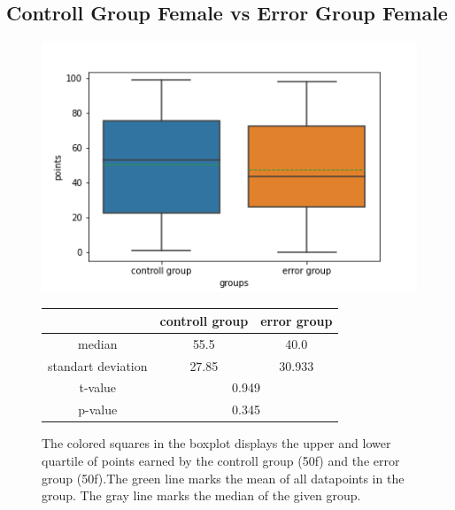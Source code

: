 \documentclass[runningheads]{llncs}
\begin{document}
\subsection{Controll Group Female vs Error Group Female}
\begin{figure}
    \begin{minipage}{0.45\textwidth}        
        \includegraphics[width=\textwidth]{code/generate/all.png}
        \caption{The colored squares in the boxplot displays
        the upper and lower quartile of points earned by the controll group (50f) and
        the error group (50f).The green line marks the mean of all datapoints in the group.
        The gray line marks the median  of the given group.} \label{fig3}
    \end{minipage}
\hfill
\begin{minipage}{0.45\textwidth}
\begin{tabular}[]{| c | c | c |}
        \hline
        & controll group & error group \\
        \hline
        median & 55.5&40.0 \\
        \hline
        standart deviation & 27.85&30.933 \\
        \hline
        t-value & \multicolumn{2}{c|}{0.949} \\
        \hline
        p-value & \multicolumn{2}{c|}{0.345} \\
        \hline            
\end{tabular}
\end{minipage}
\end{figure}
\end{document}
